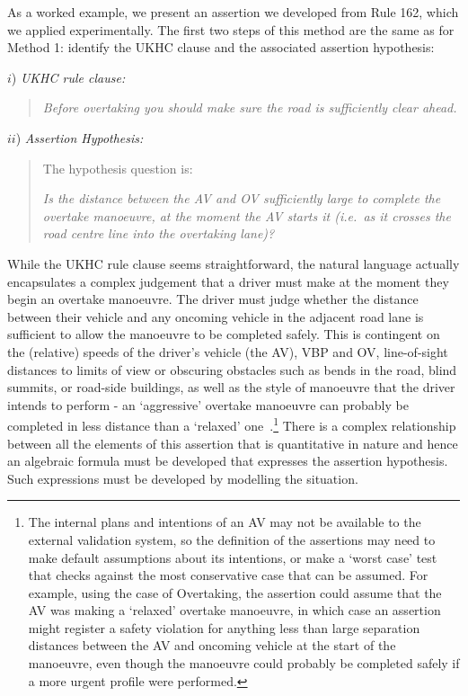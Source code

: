 As a worked example, we present an assertion we developed from Rule 162, which we applied experimentally. %
The first two steps of this method are the same as for Method 1: identify the UKHC clause and the associated assertion hypothesis:

\noindent $i$) \emph{UKHC rule clause:}
		\begin{quote}
			\textit{Before overtaking you should make sure the road is sufficiently clear ahead.}
		\end{quote}
\noindent $ii$) \emph{Assertion Hypothesis:}
	\begin{quote}
		The hypothesis question is:
		
		 \textit{Is the distance between the AV and OV sufficiently large to complete the overtake manoeuvre, at the moment the AV starts it (i.e.\ as it crosses the road centre line into the overtaking lane)?}
	\end{quote}


While the UKHC rule clause seems straightforward, the natural language actually encapsulates a complex judgement that a driver must make at the moment they begin an overtake manoeuvre. The driver must judge whether the distance between their vehicle and any oncoming vehicle in the adjacent road lane is sufficient to allow the manoeuvre to be completed safely. This is contingent on the (relative) speeds of the driver's vehicle (the AV), VBP and OV, line-of-sight distances to limits of view or obscuring obstacles such as bends in the road, blind summits, or road-side buildings, as well as the style of manoeuvre that the driver intends to perform - an `aggressive' overtake manoeuvre can probably be completed in less distance than a `relaxed' one~\cite{decastro2018counterexample, tkachenko2018line}.\footnote{The internal plans and intentions of an AV may not be available to the external validation system, so the definition of the assertions may need to make default assumptions about its intentions, or make a `worst case' test that checks against the most conservative case that can be assumed. For example, using the case of Overtaking, the assertion could assume that the AV was making a `relaxed' overtake manoeuvre, in which case an assertion might register a safety violation for anything less than large separation distances between the AV and oncoming vehicle at the start of the manoeuvre, even though the manoeuvre could probably be completed safely if a more urgent profile were performed.} There is a complex relationship between all the elements of this assertion that is quantitative in nature and hence an algebraic formula must be developed that expresses the assertion hypothesis. Such expressions must be developed by modelling the situation.

